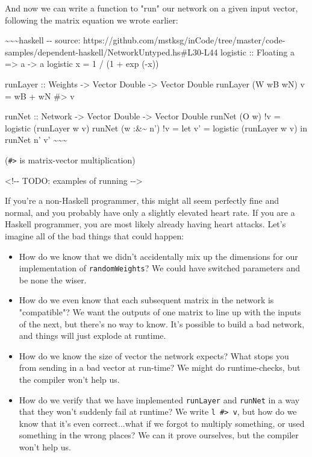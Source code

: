 \documentclass[]{article}
\begin{document}
And now we can write a function to "run" our network on a given input vector,
following the matrix equation we wrote earlier:

\textasciitilde{}\textasciitilde{}\textasciitilde{}haskell -\/- source:
https://github.com/mstksg/inCode/tree/master/code-samples/dependent-haskell/NetworkUntyped.hs\#L30-L44
logistic :: Floating a =\textgreater{} a -\textgreater{} a logistic x = 1 / (1 +
exp (-x))

runLayer :: Weights -\textgreater{} Vector Double -\textgreater{} Vector Double
runLayer (W wB wN) v = wB + wN \#\textgreater{} v

runNet :: Network -\textgreater{} Vector Double -\textgreater{} Vector Double
runNet (O w) !v = logistic (runLayer w v) runNet (w :\&\textasciitilde{} n') !v
= let v' = logistic (runLayer w v) in runNet n' v'
\textasciitilde{}\textasciitilde{}\textasciitilde{}

(\texttt{\#\textgreater{}} is matrix-vector multiplication)

\textless{}!-\/- TODO: examples of running -\/-\textgreater{}

If you're a non-Haskell programmer, this might all seem perfectly fine and
normal, and you probably have only a slightly elevated heart rate. If you are a
Haskell programmer, you are most likely already having heart attacks. Let's
imagine all of the bad things that could happen:

\begin{itemize}
\item
  How do we know that we didn't accidentally mix up the dimensions for our
  implementation of \texttt{randomWeights}? We could have switched parameters
  and be none the wiser.
\item
  How do we even know that each subsequent matrix in the network is
  "compatible"? We want the outputs of one matrix to line up with the inputs of
  the next, but there's no way to know. It's possible to build a bad network,
  and things will just explode at runtime.
\item
  How do we know the size of vector the network expects? What stops you from
  sending in a bad vector at run-time? We might do runtime-checks, but the
  compiler won't help us.
\item
  How do we verify that we have implemented \texttt{runLayer} and
  \texttt{runNet} in a way that they won't suddenly fail at runtime? We write
  \texttt{l\ \#\textgreater{}\ v}, but how do we know that it's even
  correct...what if we forgot to multiply something, or used something in the
  wrong places? We can it prove ourselves, but the compiler won't help us.
\end{itemize}
\end{document}
